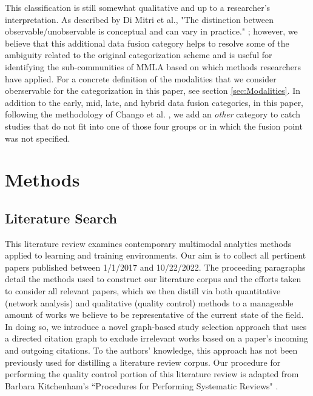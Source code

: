 \documentclass[manuscript,screen,review]{acmart}
\begin{document}
This classification is still somewhat qualitative and up to a researcher's interpretation. As described by Di Mitri et al., "The distinction between observable/unobservable is conceptual and can vary in practice." \cite{DiMitri2018}; however, we believe that this additional data fusion category helps to resolve some of the ambiguity related to the original categorization scheme and is useful for identifying the sub-communities of MMLA based on which methods researchers have applied. For a concrete definition of the modalities that we consider oberservable for the categorization in this paper, see section \ref{sec:Modalities}. In addition to the early, mid, late, and hybrid data fusion categories, in this paper, following the methodology of Chango et al. \cite{Chango2022}, we add an \textit{other} category to catch studies that do not fit into one of those four groups or in which the fusion point was not specified.



\section{Methods} \label{sec:methods} %


\subsection{Literature Search} \label{subsec:literature_search}

This literature review examines contemporary multimodal analytics methods applied to learning and training environments. Our aim is to collect all pertinent papers published between 1/1/2017 and 10/22/2022. The proceeding paragraphs detail the methods used to construct our literature corpus and the efforts taken to consider all relevant papers, which we then distill via both quantitative (network analysis) and qualitative (quality control) methods to a manageable amount of works we believe to be representative of the current state of the field. In doing so, we introduce a novel graph-based study selection approach that uses a directed citation graph to exclude irrelevant works based on a paper's incoming and outgoing citations. To the authors' knowledge, this approach has not been previously used for distilling a literature review corpus. Our procedure for performing the quality control portion of this literature review is adapted from Barbara Kitchenham's ``Procedures for Performing Systematic Reviews" \cite{kitchenham2004procedures}.
\end{document}

